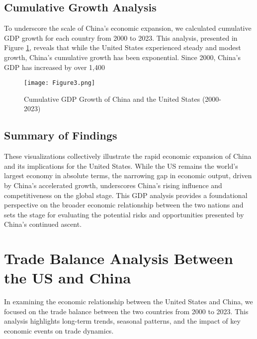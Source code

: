 \documentclass{article}
\begin{document}
\subsection{Cumulative Growth Analysis}

To underscore the scale of China’s economic expansion, we calculated cumulative GDP growth for each country from 2000 to 2023. This analysis, presented in Figure \ref{fig3}, reveals that while the United States experienced steady and modest growth, China’s cumulative growth has been exponential. Since 2000, China’s GDP has increased by over 1,400%

\begin{figure}[H]
    \centering
    \texttt{[image: Figure3.png]}
    \caption{Cumulative GDP Growth of China and the United States (2000-2023)}
    \label{fig3}
\end{figure}

\subsection{Summary of Findings}

These visualizations collectively illustrate the rapid economic expansion of China and its implications for the United States. While the US remains the world’s largest economy in absolute terms, the narrowing gap in economic output, driven by China’s accelerated growth, underscores China’s rising influence and competitiveness on the global stage. This GDP analysis provides a foundational perspective on the broader economic relationship between the two nations and sets the stage for evaluating the potential risks and opportunities presented by China’s continued ascent.

\section{Trade Balance Analysis Between the US and China}

In examining the economic relationship between the United States and China, we focused on the trade balance between the two countries from 2000 to 2023. This analysis highlights long-term trends, seasonal patterns, and the impact of key economic events on trade dynamics.
\end{document}
